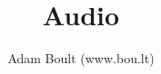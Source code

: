 \documentclass[oneside]{book}
\begin{document}
\author{Adam Boult (www.bou.lt)}
\title{Audio}
\maketitle

\setcounter{tocdepth}{0}
\tableofcontents


\end{document}
